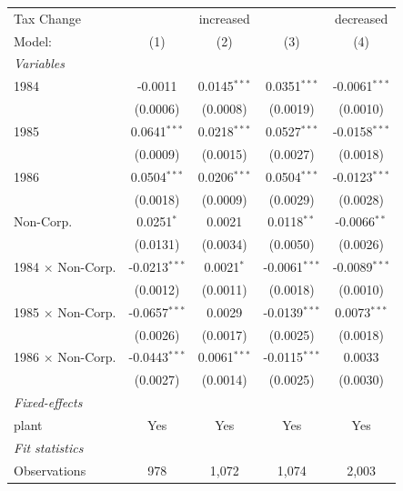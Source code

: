 \documentclass[
  12pt]{article}
\theoremstyle{definition}
\theoremstyle{remark}
\begin{document}
\begin{table}
\begin{minipage}{\linewidth}
\begin{tabular}{lcccc}
   Tax Change & \multicolumn{3}{c}{increased} & decreased \\ 
   Model:                   & (1)             & (2)            & (3)             & (4)\\  
   \midrule
   \emph{Variables}\\
   1984                     & -0.0011         & 0.0145$^{***}$ & 0.0351$^{***}$  & -0.0061$^{***}$\\   
                            & (0.0006)        & (0.0008)       & (0.0019)        & (0.0010)\\   
   1985                     & 0.0641$^{***}$  & 0.0218$^{***}$ & 0.0527$^{***}$  & -0.0158$^{***}$\\   
                            & (0.0009)        & (0.0015)       & (0.0027)        & (0.0018)\\   
   1986                     & 0.0504$^{***}$  & 0.0206$^{***}$ & 0.0504$^{***}$  & -0.0123$^{***}$\\   
                            & (0.0018)        & (0.0009)       & (0.0029)        & (0.0028)\\   
   Non-Corp.                & 0.0251$^{*}$    & 0.0021         & 0.0118$^{**}$   & -0.0066$^{**}$\\   
                            & (0.0131)        & (0.0034)       & (0.0050)        & (0.0026)\\   
   1984 $\times$ Non-Corp.  & -0.0213$^{***}$ & 0.0021$^{*}$   & -0.0061$^{***}$ & -0.0089$^{***}$\\   
                            & (0.0012)        & (0.0011)       & (0.0018)        & (0.0010)\\   
   1985 $\times$ Non-Corp.  & -0.0657$^{***}$ & 0.0029         & -0.0139$^{***}$ & 0.0073$^{***}$\\   
                            & (0.0026)        & (0.0017)       & (0.0025)        & (0.0018)\\   
   1986 $\times$ Non-Corp.  & -0.0443$^{***}$ & 0.0061$^{***}$ & -0.0115$^{***}$ & 0.0033\\   
                            & (0.0027)        & (0.0014)       & (0.0025)        & (0.0030)\\   
   \midrule
   \emph{Fixed-effects}\\
   plant                    & Yes             & Yes            & Yes             & Yes\\  
   \midrule
   \emph{Fit statistics}\\
   Observations             & 978             & 1,072          & 1,074           & 2,003\\  

\end{tabular}
\end{minipage}
\end{table}
\end{document}

